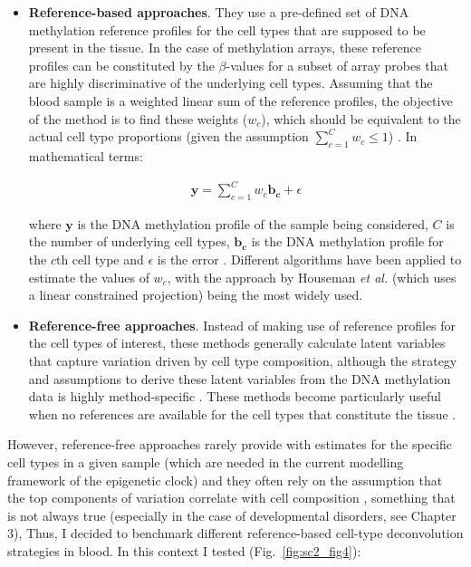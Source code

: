 \begin{itemize}
	
	\item \textbf{Reference-based approaches}. They use a pre-defined set of DNA methylation reference profiles for the cell types that are supposed to be present in the tissue. In the case of methylation arrays, these reference profiles can be constituted by the $\beta$-values for a subset of array probes that are highly discriminative of the underlying cell types. Assuming that the blood sample is a weighted linear sum of the reference profiles, the objective of the method is to find these weights ($w_c$), which should be equivalent to the actual cell type proportions (given the assumption $\sum_{c=1}^{C} w_c \leq 1$) \cite{Teschendorff2017}. In mathematical terms:
	
	\begin{align}
	\mathbf{y} = \sum_{c=1}^{C} w_c \mathbf{b_c} + \epsilon
	\end{align}
	
	where $\mathbf{y}$ is the DNA methylation profile of the sample being considered, $C$ is the number of underlying cell types, $\mathbf{b_c}$ is the DNA methylation profile for the $c$th cell type and $\epsilon$ is the error \cite{Teschendorff2017a}. Different algorithms have been applied to estimate the values of $w_c$, with the approach by Houseman \textit{et al.} (which uses a linear constrained projection) \cite{Houseman2012} being the most widely used. 
	
	\item \textbf{Reference-free approaches}. Instead of making use of reference profiles for the cell types of interest, these methods generally calculate latent variables that capture variation driven by cell type composition, although the strategy and assumptions to derive these latent variables from the DNA methylation data is highly method-specific \cite{Teschendorff2017}. These methods become particularly useful when no references are available for the cell types that constitute the tissue \cite{Teschendorff2017}.
	
\end{itemize} 

However, reference-free approaches rarely provide with estimates for the specific cell types in a given sample \cite{Teschendorff2017} (which are needed in the current modelling framework of the epigenetic clock) and they often rely on the assumption that the top components of variation correlate with cell composition \cite{Teschendorff2017a}, something that is not always true (especially in the case of developmental disorders, see Chapter 3), Thus, I decided to benchmark different reference-based cell-type deconvolution strategies in blood. In this context I tested (Fig.~\ref{fig:sc2_fig4}):

